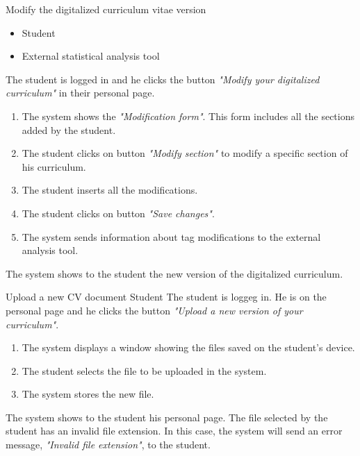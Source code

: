 \usecase
{Modify the digitalized curriculum vitae version}
{
    \begin{itemize}
        \item Student
        \item External statistical analysis tool
    \end{itemize}
}
{
    The student is logged in and he clicks the button \textit{"Modify your digitalized curriculum"} in their personal page.
}
{
    \begin{enumerate}
        \item The system shows the \textit{"Modification form"}. This form includes all the sections added by the student.
        \item The student clicks on button \textit{"Modify section"} to modify a specific section of his curriculum.
        \item The student inserts all the modifications.
        \item The student clicks on button \textit{"Save changes"}.
        \item The system sends information about tag modifications to the external analysis tool.
    \end{enumerate}
}
{
    The system shows to the student the new version of the digitalized curriculum.
}
{

}
{

}

\usecase
{Upload a new CV document}
{
    Student
}
{
    The student is loggeg in. He is on the personal page and he clicks the button \textit{"Upload a new version of your curriculum"}.
}
{
    \begin{enumerate}
        \item The system displays a window showing the files saved on the student's device.
        \item The student selects the file to be uploaded in the system.
        \item The system stores the new file.
    \end{enumerate}
}
{
    The system shows to the student his personal page.
}
{
    The file selected by the student has an invalid file extension. In this case, the system will send an error message, \textit{"Invalid file extension"}, to the student.
}
{

}

